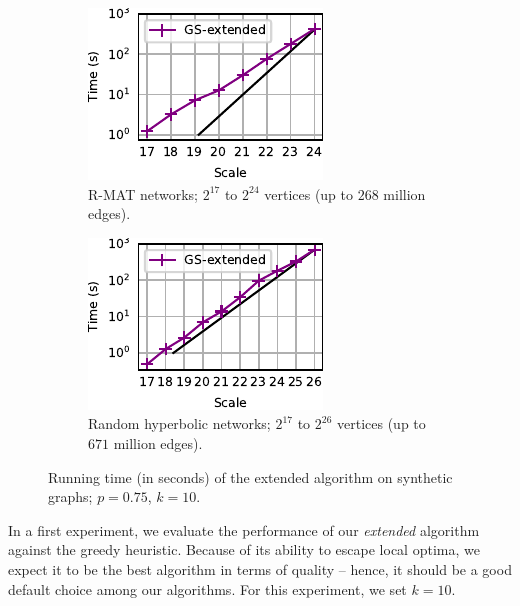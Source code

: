 \begin{figure}[tb]
\centering
\begin{subfigure}[t]{.45\textwidth}
\centering
\includegraphics{./sources/plots/local-search-heu/gs-extended-time-rmat.pdf}
\caption{R-MAT networks; $2^{17}$
to $2^{24}$ vertices (up to $268$ million edges).}
\label{fig:lsh-gc-time-rmat}
\end{subfigure}\hfill
\begin{subfigure}[t]{.45\textwidth}
\centering
\includegraphics{./sources/plots/local-search-heu/gs-extended-time-rhg.pdf}
\caption{Random hyperbolic networks; $2^{17}$
to $2^{26}$ vertices (up to $671$ million edges).}
\label{fig:lsh-gc-time-rhg}
\end{subfigure}
\caption{Running time (in seconds) of the extended \growshrink algorithm on
synthetic graphs; $p = 0.75$, $k = 10$.}
\label{fig:lsh-gc-time-synthetic}
\end{figure}

In a first experiment, we evaluate the performance of our \emph{extended}
\growshrink algorithm against the greedy heuristic.
Because of its ability to escape local optima, we expect it to be the
best algorithm in terms of quality -- hence, it should be a good default
choice among our algorithms. For this experiment, we set $k = 10$.

